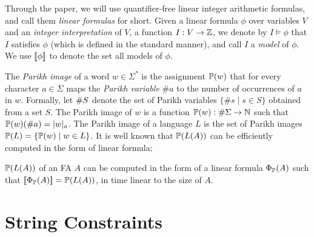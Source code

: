 \documentclass[sigplan,review,anonymous]{acmart}\settopmatter{printfolios=true,printccs=false,printacmref=false}
\begin{document}
Through the paper, we will use quantifier-free linear integer arithmetic formulas, and call them \emph{linear formulas} for short.  
Given a linear formula $\phi$ over variables $V$ and an \emph{integer interpretation} of $V$, a function $I:V\rightarrow \mathbb{Z}$, 
we denote by $I\models \phi$ that $I$ satisfies $\phi$ (which is defined in the standard manner), and call $I$ a \emph{model} of $\phi$. 
We use $[\![\phi]\!]$ to denote the set all models of $\phi$. 
%


The \emph{Parikh image} of a word $w\in \Sigma^*$ is the assignment 
$\mathbb{P}{(w)}$ that for every character $a\in\Sigma$ maps the \emph{Parikh variable} $\#a$ to the number of occurrences of $a$ in $w$.
Formally, let $\#{S}$ denote the set of Parikh variables $\{\#s \mid s\in S\}$ obtained from a set $S$. 
The Parikh image of $w$ is a function $\mathbb{P}{(w)}:\#{\Sigma} \rightarrow \mathbb{N}$ such that $\mathbb{P}{(w)} (\#a) = |w|_a$. 
The Parikh image of a language $L$ is the set of Parikh images $\mathbb{P}{(L)} = \{\mathbb{P}{(w)} \mid w \in L\}$. %
%
It is well known that $\mathbb{P}{(L(A))}$ can be efficiently computed in the form of linear formula:



\begin{lemma}
$\mathbb{P}{(L(A))}$ of an FA $A$ can be computed in the form of a linear formula $\Phi_{\mathbb{P}}(A)$ such that 
$[\![\Phi_{\mathbb{P}}(A)]\!] = \mathbb{P}{(L(A))}$, 
in time linear to the size of $A$.
\end{lemma}



 


\section{String Constraints} \label{section:sc}
\end{document}
